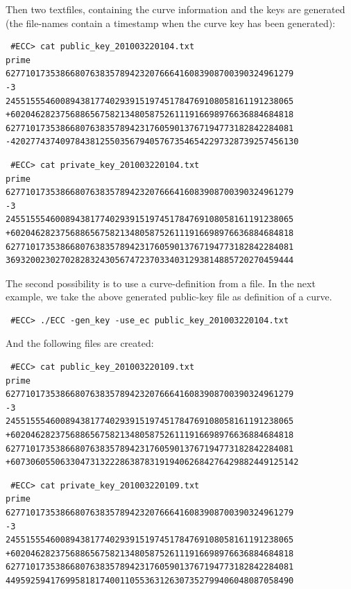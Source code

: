 \documentclass[11pt,english]{article}
\begin{document}
Then two textfiles, containing the curve information and the keys are generated (the file-names contain a timestamp when the curve key has been generated):

\begin{verbatim}
 #ECC> cat public_key_201003220104.txt
prime
6277101735386680763835789423207666416083908700390324961279
-3
2455155546008943817740293915197451784769108058161191238065
+602046282375688656758213480587526111916698976636884684818
6277101735386680763835789423176059013767194773182842284081
-4202774374097843812550356794057673546542297328739257456130
\end{verbatim}

\begin{verbatim}
 #ECC> cat private_key_201003220104.txt
prime
6277101735386680763835789423207666416083908700390324961279
-3
2455155546008943817740293915197451784769108058161191238065
+602046282375688656758213480587526111916698976636884684818
6277101735386680763835789423176059013767194773182842284081
3693200230270282832430567472370334031293814885720270459444
\end{verbatim}

The second possibility is to use a curve-definition from a file. In the next example, we take the above generated public-key file as definition of a curve.

\begin{verbatim}
 #ECC> ./ECC -gen_key -use_ec public_key_201003220104.txt
\end{verbatim}

And the following files are created:

\begin{verbatim}
 #ECC> cat public_key_201003220109.txt
prime
6277101735386680763835789423207666416083908700390324961279
-3
2455155546008943817740293915197451784769108058161191238065
+602046282375688656758213480587526111916698976636884684818
6277101735386680763835789423176059013767194773182842284081
+6073060550633047313222863878319194062684276429882449125142
\end{verbatim}
\begin{verbatim}
 #ECC> cat private_key_201003220109.txt
prime
6277101735386680763835789423207666416083908700390324961279
-3
2455155546008943817740293915197451784769108058161191238065
+602046282375688656758213480587526111916698976636884684818
6277101735386680763835789423176059013767194773182842284081
4495925941769958181740011055363126307352799406048087058490
\end{verbatim}
\end{document}
